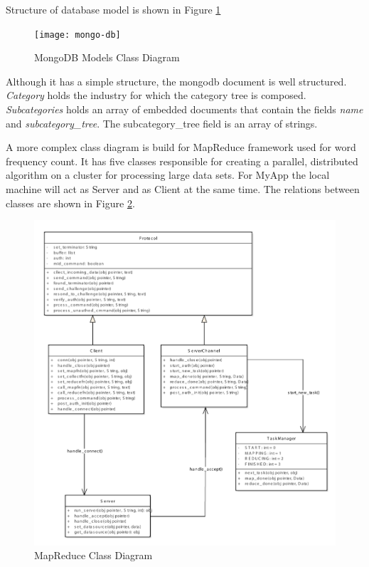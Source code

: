 Structure of database model is shown in Figure \ref{classMongo_uml}

\begin{figure}[!ht]
\centering
\texttt{[image: mongo-db]}
\caption{MongoDB Models Class Diagram}\label{classMongo_uml}
\end{figure}

Although it has a simple structure, the mongodb document is well structured. \textit{Category} holds the industry for which the category tree is composed. \textit{Subcategories} holds an array of embedded documents that contain the fields \textit{name} and \textit{subcategory\_tree}. The subcategory\_tree field is an array of strings. 

A more complex class diagram is build for MapReduce framework used for word frequency count. It has five classes responsible for creating a parallel, distributed algorithm on a cluster for processing large data sets. For MyApp the local machine will act as Server and as Client at the same time. The relations between classes are shown in Figure \ref{hadoop_uml}.

\begin{figure}[!ht]
\centering
\includegraphics[width=16cm]{hadoop}
\caption{MapReduce Class Diagram}\label{hadoop_uml}
\end{figure}


